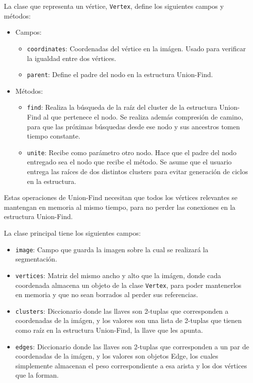 \documentclass[letterpaper,11pt]{article} %
\begin{document}
  La clase que representa un vértice, \texttt{Vertex}, define los siguientes campos y métodos:
  \begin{itemize}
    \item Campos:
    \begin{itemize}
      \item \texttt{coordinates}: Coordenadas del vértice en la imágen. Usado para verificar la igualdad entre dos vértices.
      \item \texttt{parent}: Define el padre del nodo en la estructura Union-Find.
    \end{itemize}
    \item Métodos:
    \begin{itemize}
      \item \texttt{find}: Realiza la búsqueda de la raíz del cluster de la estructura Union-Find al que pertenece el nodo. Se realiza además compresión de camino, para que las próximas búsquedas desde ese nodo y sus ancestros tomen tiempo constante.
      \item \texttt{unite}: Recibe como parámetro otro nodo. Hace que el padre del nodo entregado sea el nodo que recibe el método. Se asume que el usuario entrega las raíces de dos distintos clusters para evitar generación de ciclos en la estructura.
    \end{itemize}
  \end{itemize}
  Estas operaciones de Union-Find necesitan que todos los vértices relevantes se mantengan en memoria al mismo tiempo, para no perder las conexiones en la estructura Union-Find.

  La clase principal tiene los siguientes campos:
  \begin{itemize}
    \item \texttt{image}: Campo que guarda la imagen sobre la cual se realizará la segmentación.
    \item \texttt{vertices}: Matriz del mismo ancho y alto que la imágen, donde cada coordenada almacena un objeto de la clase \texttt{Vertex}, para poder mantenerlos en memoria y que no sean borrados al perder sus referencias.
    \item \texttt{clusters}: Diccionario donde las llaves son 2-tuplas que corresponden a coordenadas de la imágen, y los valores son una lista de 2-tuplas que tienen como raíz en la estructura Union-Find, la llave que les apunta.
    \item \texttt{edges}: Diccionario donde las llaves son 2-tuplas que corresponden a un par de coordenadas de la imágen, y los valores son objetos Edge, los cuales simplemente almacenan el peso correspondiente a esa arista y los dos vértices que la forman.
  \end{itemize}
\end{document}
